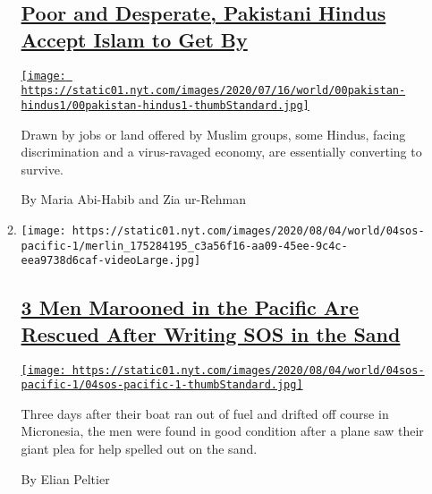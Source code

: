 \begin{enumerate}
\begin{enumerate}
    \hypertarget{poor-and-desperate-pakistani-hindus-accept-islam-to-get-by}{%
    \subsection{\texorpdfstring{\href{/2020/08/04/world/asia/pakistan-hindu-conversion.html}{Poor
    and Desperate, Pakistani Hindus Accept Islam to Get
    By}}{Poor and Desperate, Pakistani Hindus Accept Islam to Get By}}\label{poor-and-desperate-pakistani-hindus-accept-islam-to-get-by}}

    \href{/2020/08/04/world/asia/pakistan-hindu-conversion.html}{\texttt{[image: https://static01.nyt.com/images/2020/07/16/world/00pakistan-hindus1/00pakistan-hindus1-thumbStandard.jpg]}}

    Drawn by jobs or land offered by Muslim groups, some Hindus, facing
    discrimination and a virus-ravaged economy, are essentially
    converting to survive.

    By Maria Abi-Habib and Zia ur-Rehman
  \item
    \texttt{[image: https://static01.nyt.com/images/2020/08/04/world/04sos-pacific-1/merlin\_175284195\_c3a56f16-aa09-45ee-9c4c-eea9738d6caf-videoLarge.jpg]}

    \hypertarget{3-men-marooned-in-the-pacific-are-rescued-after-writing-sos-in-the-sand}{%
    \subsection{\texorpdfstring{\href{/2020/08/04/world/australia/sos-pacific-island.html}{3
    Men Marooned in the Pacific Are Rescued After Writing SOS in the
    Sand}}{3 Men Marooned in the Pacific Are Rescued After Writing SOS in the Sand}}\label{3-men-marooned-in-the-pacific-are-rescued-after-writing-sos-in-the-sand}}

    \href{/2020/08/04/world/australia/sos-pacific-island.html}{\texttt{[image: https://static01.nyt.com/images/2020/08/04/world/04sos-pacific-1/04sos-pacific-1-thumbStandard.jpg]}}

    Three days after their boat ran out of fuel and drifted off course
    in Micronesia, the men were found in good condition after a plane
    saw their giant plea for help spelled out on the sand.

    By Elian Peltier
  \end{enumerate}
\end{enumerate}

